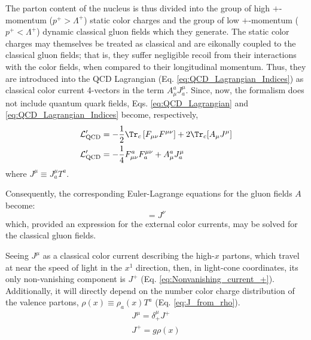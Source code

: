 The parton content of the nucleus is thus divided into the group of high $+$-momentum ($p^+ > \Lambda^+$) static color charges and the group of low $+$-momentum ($p^+ < \Lambda^+$) dynamic classical gluon fields which they generate. The static color charges may themselves be treated as classical \citep{Albacete_2014,McLerran_1994_classic_source} 
 and are eikonally coupled to the classical gluon fields; that is, they suffer negligible recoil from their interactions with the color fields, when compared to their longitudinal momentum.\cite{Gelis_2010} Thus, they are introduced into the \gls{QCD} Lagrangian (Eq. \ref{eq:QCD_Lagrangian_Indices}) as classical color current 4-vectors in the term $A_\mu^a J^\mu_a$. Since, now, the formalism does not include quantum quark fields, Eqs. \ref{eq:QCD_Lagrangian} and \ref{eq:QCD_Lagrangian_Indices} become, respectively,%
\begin{align}
	\mathcal{L}_\text{QCD}' & = - \frac{1}{2} \Tr_c \left[ F_{\mu \nu} F^{\mu \nu} \right] + 2 \Tr_c [A_\mu J^\mu] \\
	\mathcal{L}_\text{QCD}' & =  - \frac{1}{4} F_{\mu \nu}^a F^{\mu \nu}_a + A_\mu^a J^\mu_a
\end{align}
where $J^\mu \equiv J^\mu_a T^a$.

Consequently, the corresponding Euler-Lagrange equations for the gluon fields $A$ become:
\begin{equation}
	[D_\mu, F^{\mu \nu}] = J^\nu
\end{equation}
which, provided an expression for the external color currents, may be solved for the classical gluon fields.

Seeing $J^\mu$ as a classical color current describing the high-$x$ partons, which travel at near the speed of light in the $x^1$ direction, then, in light-cone coordinates, its only non-vanishing component is $J^+$ (Eq. \ref{eq:Nonvanishing_current_+}). Additionally, it will directly depend on the number color charge distribution of the valence partons, $\rho (x) \equiv \rho_a(x) T^a$ (Eq. \ref{eq:J_from_rho}).
\begin{gather}
	J^\mu = \delta^\mu_+ J^+ \label{eq:Nonvanishing_current_+} \\
	J^+ = g \rho (x) \label{eq:J_from_rho}
\end{gather}

